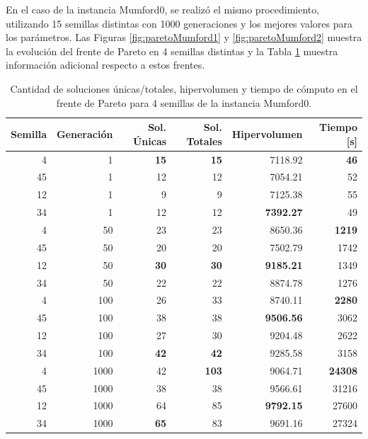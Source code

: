 En el caso de la instancia Mumford0, se realizó el mismo procedimiento, utilizando 15 semillas distintas con 1000 generaciones y los mejores valores  para los parámetros. Las Figuras \ref{fig:paretoMumford1} y \ref{fig:paretoMumford2} muestra la evolución del frente de Pareto en 4 semillas distintas y la Tabla \ref{tab:dataFrenteMumford0} muestra información adicional respecto a estos frentes.

\begin{table}[!htb]
\centering
\begin{tabular}{|r|r|r|r|r|r|}
\hline
Semilla & Generación & Sol. Únicas & Sol. Totales & Hipervolumen & Tiempo [s]\\  
\hline \hline
4 & 1 & \textbf{15} & \textbf{15} & 7118.92 & \textbf{46} \\ \hline
45 & 1 & 12 & 12 & 7054.21 & 52 \\ \hline
12 & 1 & 9 & 9 & 7125.38 & 55 \\ \hline
34 & 1 & 12 & 12 & \textbf{7392.27} & 49 \\ \hline\hline
4 & 50 & 23 & 23 & 8650.36 & \textbf{1219} \\ \hline
45 & 50 & 20 & 20 & 7502.79 & 1742 \\ \hline
12 & 50 & \textbf{30} & \textbf{30} & \textbf{9185.21} & 1349 \\ \hline
34 & 50 & 22 & 22 & 8874.78 & 1276 \\ \hline\hline
4 & 100 & 26 & 33 & 8740.11 & \textbf{2280} \\ \hline
45 & 100 & 38 & 38 & \textbf{9506.56} & 3062 \\ \hline
12 & 100 & 27 & 30 & 9204.48 & 2622 \\ \hline
34 & 100 & \textbf{42} & \textbf{42} & 9285.58 & 3158 \\ \hline\hline
4 & 1000 & 42 & \textbf{103} & 9064.71 & \textbf{24308} \\ \hline
45 & 1000 & 38 & 38 & 9566.61 & 31216 \\ \hline
12 & 1000 & 64 & 85 & \textbf{9792.15} & 27600 \\ \hline
34 & 1000 & \textbf{65} & 83 & 9691.16 & 27324 \\ \hline\hline
\end{tabular}
\caption{Cantidad de soluciones únicas/totales, hipervolumen y tiempo de cómputo en el frente de Pareto para 4 semillas de la instancia Mumford0.}
\label{tab:dataFrenteMumford0}
\end{table}

